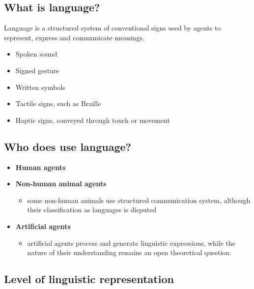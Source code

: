 \documentclass[a4paper]{article}
\theoremstyle{definition}
\begin{document}
\subsection{What is language?}
Language is a structured system of conventional signs used by agents to represent, express and communicate meanings.
\begin{itemize}
    \item Spoken sound
    \item Signed gesture
    \item Written symbols
    \item Tactile signs, such as Braille
    \item Haptic signs, conveyed through touch or movement
\end{itemize}

\subsection{Who does use language?}
\begin{itemize}
    \item \textbf{Human agents}
    \item \textbf{Non-human animal agents}
        \begin{itemize}
            \item some non-human animals use structured communication system, although their classification
                as languages is disputed
        \end{itemize}
    \item \textbf{Artificial agents}
        \begin{itemize}
            \item artificial agents process and generate linguistic expressions, while the nature of their understanding remains an open theoretical question.
        \end{itemize}
\end{itemize}
\subsection{Level of linguistic representation}
\end{document}
